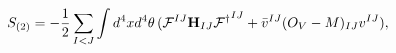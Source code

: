 \begin{equation}\label{s2}
S_{(2)}= -{1\over 2}\sum_{I<J}\int d^{4}x d^{4}\theta\, ({\cal
F}^{IJ}{\bf H}_{IJ}{\cal F^{\dag}}^{IJ}+ \bar{v}^{IJ}(O_{V}-
M)_{IJ} v^{IJ}),
\end{equation}

